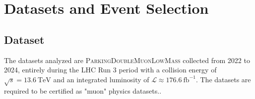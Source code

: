 \documentclass[10pt,twocolumn]{article}
\begin{document}
\section{Datasets and Event Selection}

\subsection{Dataset}

The datasets analyzed are \textsc{ParkingDoubleMuonLowMass} collected from 2022 to 2024, entirely during the LHC Run 3 period with a collision energy of $\sqrt{s} = 13.6 ~\text{TeV}$ and an integrated luminosity of $\mathcal{L}\approx176.6~\text{fb}^{-1}$. The datasets are required to be certified as "muon" physics datasets.\cite{CMS:LUM-22-001}\cite{CMS:DP-LUMI-2023}\cite{CMS:LUMI-PUB}.
\end{document}
